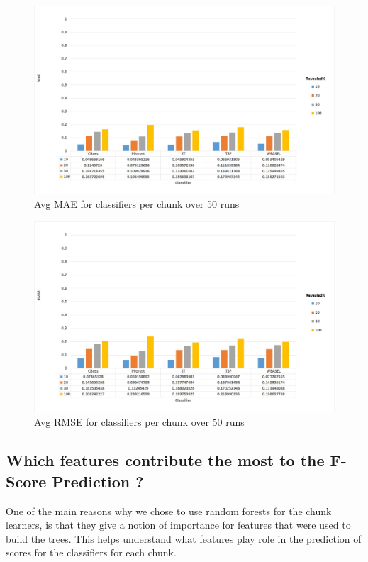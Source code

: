   \begin{figure}[hp!]
    \captionsetup{justification=raggedright}
    \centering
    \includegraphics[width=\textwidth]{MAE_classifier.JPG}
    \centering
    \caption{Avg MAE for classifiers per chunk over 50 runs}
    \label{Img:MAEClassifier}
  \end{figure}

  \begin{figure}[hp!]
    \captionsetup{justification=raggedright}
    \centering
    \includegraphics[width=\textwidth]{RMSE_classifier.JPG}
    \centering
    \caption{Avg RMSE for classifiers per chunk over 50 runs}
    \label{Img:RMSEClassifier}
  \end{figure}

\subsection{Which features contribute the most to the F-Score Prediction ?}
\label{SubsectionFeature}
One of the main reasons why we chose to use random forests for the chunk learners, is that they give a notion of importance for features that were used to build the trees.
This helps understand what features play role in the prediction of scores for the classifiers for each chunk.

